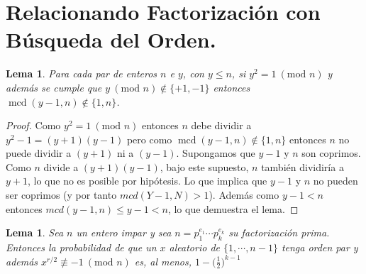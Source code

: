 \documentclass[11pt, spanish]{report}
\numberwithin{equation}{section}
\newtheorem{lema}[defin]{Lema}
\numberwithin{defin}{section}
\DeclareMathOperator{\mcd}{mcd}
\newenvironment{yellowBox}{\begin{tcolorbox}[colback=yellow!5!white,colframe=yellow!75!black]}{\end{tcolorbox}}
\begin{document}
\section{Relacionando Factorización con Búsqueda del Orden.}

\begin{yellowBox}
\begin{lema}\label{shor:lema5}
Para cada par de enteros $n$ e $y$, con $y\leq n$, si $y^2=1\ (\text{mod }n)$ y además se cumple que $y\ (\text{mod }n)\not\in \{+1, -1\}$ entonces $\mcd(y-1,n)\not\in\{1,n\}$. 
\end{lema}
\end{yellowBox}

\begin{proof}

Como $y^2=1\ (\text{mod }n)$ entonces $n$ debe dividir a $y^2-1=(y+1)(y-1)$ pero como $\mcd(y-1,n)\not\in\{1,n\}$ entonces $n$ no puede dividir a $(y+1)$ ni a $(y-1)$. Supongamos que $y-1$ y $n$ son coprimos. Como $n$ divide a $(y+1)(y-1)$, bajo este supuesto, $n$ también dividiría a $y+1$, lo que no es posible por hipótesis. Lo que implica que $y-1$ y $n$ no pueden ser coprimos (y por tanto $mcd(Y-1,N)>1$). Además como $y-1<n$ entonces $mcd(y-1,n)\leq y-1<n$, lo que demuestra el lema. 

\end{proof}

\begin{yellowBox}
\begin{lema}\label{shor:lema4}
Sea $n$ un entero impar\footnotemark{} y sea $n=p_1^{e_1}\cdots p_k^{e_k}$ su factorización prima. Entonces la probabilidad de que un $x$ aleatorio de $\{1,\cdots,n-1\}$ tenga orden par y además $x^{r/2}\not\equiv -1\ (\text{mod }n)$ es, al menos, $1-\Big(\frac{1}{2}\Big)^{k-1}$
\end{lema}
\end{yellowBox}

\end{document}
